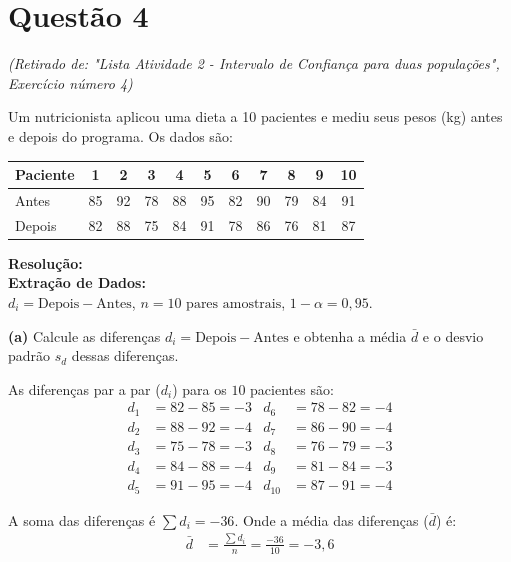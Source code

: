 \documentclass[12pt, a4paper]{article}
\begin{document}
\section*{Questão 4}
\textit{(Retirado de: "Lista Atividade 2 - Intervalo de Confiança para duas populações", Exercício número 4)}

Um nutricionista aplicou uma dieta a 10 pacientes e mediu seus pesos (kg) antes e depois do programa. Os dados são:

\begin{table}[h]
\centering
\begin{tabular}{lcccccccccc}
\toprule
\textbf{Paciente} & \textbf{1} & \textbf{2} & \textbf{3} & \textbf{4} & \textbf{5} & \textbf{6} & \textbf{7} & \textbf{8} & \textbf{9} & \textbf{10} \\ \midrule
Antes & 85 & 92 & 78 & 88 & 95 & 82 & 90 & 79 & 84 & 91 \\
Depois & 82 & 88 & 75 & 84 & 91 & 78 & 86 & 76 & 81 & 87 \\ \bottomrule
\end{tabular}
\end{table}

\vspace{0.3cm}
\noindent\textbf{Resolução:}\\
\textbf{Extração de Dados:} \\
$d_i = \text{Depois} - \text{Antes}$, $n = 10 \text{ pares amostrais}$, $1-\alpha = 0,95$.

\medskip\noindent\textbf{(a)} Calcule as diferenças $d_i = \text{Depois} - \text{Antes}$ e obtenha a média $\bar{d}$ e o desvio padrão $s_d$ dessas diferenças.

\noindent As diferenças par a par ($d_i$) para os $10$ pacientes são:
\begin{align*}
d_1 &= 82 - 85 = -3 & d_6 &= 78 - 82 = -4 \\
d_2 &= 88 - 92 = -4 & d_7 &= 86 - 90 = -4 \\
d_3 &= 75 - 78 = -3 & d_8 &= 76 - 79 = -3 \\
d_4 &= 84 - 88 = -4 & d_9 &= 81 - 84 = -3 \\
d_5 &= 91 - 95 = -4 & d_{10} &= 87 - 91 = -4
\end{align*}

\noindent A soma das diferenças é $\sum d_i = -36$. Onde a média das diferenças ($\bar{d}$) é:
\begin{align*}
\bar{d} &= \frac{\sum d_i}{n} = \frac{-36}{10} = \boxed{-3,6}
\end{align*}
\end{document}
